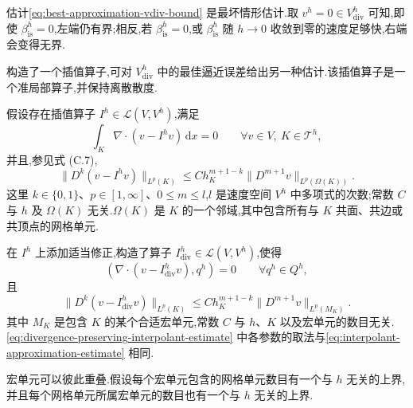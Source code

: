 \begin{note}\label{note:best-approximation-estimate-comment}
估计\cref{eq:best-approximation-vdiv-bound} 是最坏情形估计.取 $v^h=0\in V_{\mathrm{div}}^h$ 可知,即使 $\beta_{\mathrm{is}}^h=0$,左端仍有界;相反,若 $\beta_{\mathrm{is}}^h=0$,或 $\beta_{\mathrm{is}}^h$ 随 $h\to0$ 收敛到零的速度足够快,右端会变得无界.
\end{note}

\begin{note}\label{note:alternative-best-approximation-vdiv}
\textcite{GiraultScott2003} 构造了一个插值算子,可对 $V_{\mathrm{div}}^h$ 中的最佳逼近误差给出另一种估计.该插值算子是一个准局部算子,并保持离散散度.

假设存在插值算子 $I^h\in\mathcal{L}(V,V^h)$,满足
\begin{equation}\label{eq:interpolant-divergence-mean}
  \int_K\nabla\cdot(v-I^h v)\,\mathrm{d}x=0
  \qquad\forall v\in V,\ K\in\mathcal{T}^h,
\end{equation}
并且,参见式 (C.7),
\begin{equation}\label{eq:interpolant-approximation-estimate}
  \|D^k(v-I^h v)\|_{L^p(K)}
    \le Ch_K^{m+1-k}\|D^{m+1}v\|_{L^p(\Omega(K))}.
\end{equation}
这里 $k\in\{0,1\}$、$p\in[1,\infty]$、$0\le m\le l$,$l$ 是速度空间 $V^h$ 中多项式的次数;常数 $C$ 与 $h$ 及 $\Omega(K)$ 无关.$\Omega(K)$ 是 $K$ 的一个邻域,其中包含所有与 $K$ 共面、共边或共顶点的网格单元.

\textcite{GiraultScott2003} 在 $I^h$ 上添加适当修正,构造了算子 $I_{\mathrm{div}}^h\in\mathcal{L}(V,V^h)$,使得
\begin{equation}\label{eq:divergence-preserving-interpolant}
  (\nabla\cdot(v-I_{\mathrm{div}}^h v),q^h)=0
  \qquad\forall q^h\in Q^h,
\end{equation}
且
\begin{equation}\label{eq:divergence-preserving-interpolant-estimate}
  \|D^k(v-I_{\mathrm{div}}^h v)\|_{L^p(K)}
    \le Ch_K^{m+1-k}\|D^{m+1}v\|_{L^p(M_K)}.
\end{equation}
其中 $M_K$ 是包含 $K$ 的某个合适宏单元,常数 $C$ 与 $h$、$K$ 以及宏单元的数目无关.\cref{eq:divergence-preserving-interpolant-estimate} 中各参数的取法与\cref{eq:interpolant-approximation-estimate} 相同.

宏单元可以彼此重叠.假设每个宏单元包含的网格单元数目有一个与 $h$ 无关的上界,并且每个网格单元所属宏单元的数目也有一个与 $h$ 无关的上界.


\end{note}
